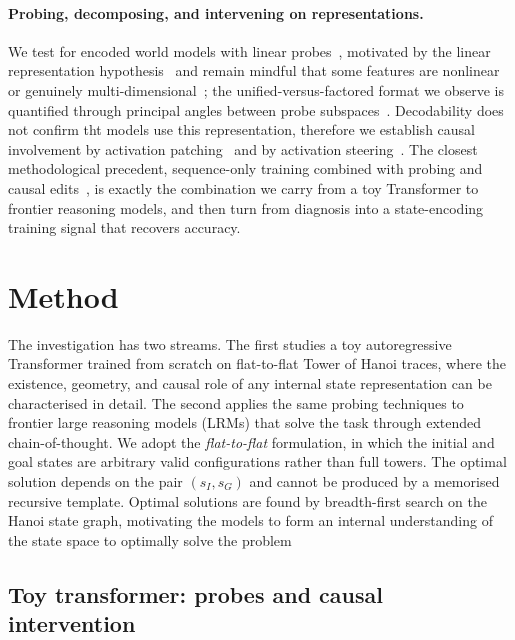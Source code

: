 \documentclass{article} %
\begin{document}
\paragraph{Probing, decomposing, and intervening on representations.}
We test for encoded world models with linear probes~\citep{belinkov2022probing}, motivated by the linear representation hypothesis~\citep{mikolov2013linguistic, park2023linear} and remain mindful that some features are nonlinear or genuinely
multi-dimensional~\citep{csordas2024recurrent, engels2025not}; the unified-versus-factored format we observe is quantified through principal angles between probe subspaces~\citep{bjorck1973numerical}. Decodability does not confirm tht models use this representation, therefore we establish causal involvement by activation patching~\citep{vig2020investigating, meng2022locating, wang2022interpretability} and by activation steering~\citep{turner2023steering, subramani2022extracting, hernandez2023inspecting}. The
closest methodological precedent, sequence-only training combined with probing and causal edits~\citep{li2022emergent, spies2025transformers}, is exactly the
combination we carry from a toy Transformer to frontier reasoning models, and then turn from diagnosis into a state-encoding training signal that recovers accuracy.

\section{Method}
\label{sec:method}

The investigation has two streams. The first studies a toy autoregressive Transformer trained from scratch on flat-to-flat Tower of Hanoi traces, where the existence, geometry, and causal role of any internal state representation can be characterised in detail. The second applies the same probing techniques to frontier large reasoning models (LRMs) that solve the task through extended chain-of-thought. We adopt the \emph{flat-to-flat} formulation, in which the initial and goal states are arbitrary valid configurations rather than full towers. The optimal solution depends on the pair $(s_I,s_G)$ and cannot be produced by a memorised recursive template. Optimal solutions are found by breadth-first search on the Hanoi state graph, motivating the models to form an internal understanding of the state space to optimally solve the problem

\subsection{Toy transformer: probes and causal intervention}
\label{sec:method-toy}
\end{document}
